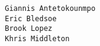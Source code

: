 \documentclass[10pt]{article}
\begin{document}
    \begin{Verbatim}[commandchars=\\\{\}, baselinestretch=0.8]
Giannis Antetokounmpo
Eric Bledsoe
Brook Lopez
Khris Middleton

    \end{Verbatim}


    
    
    
    
\end{document}
